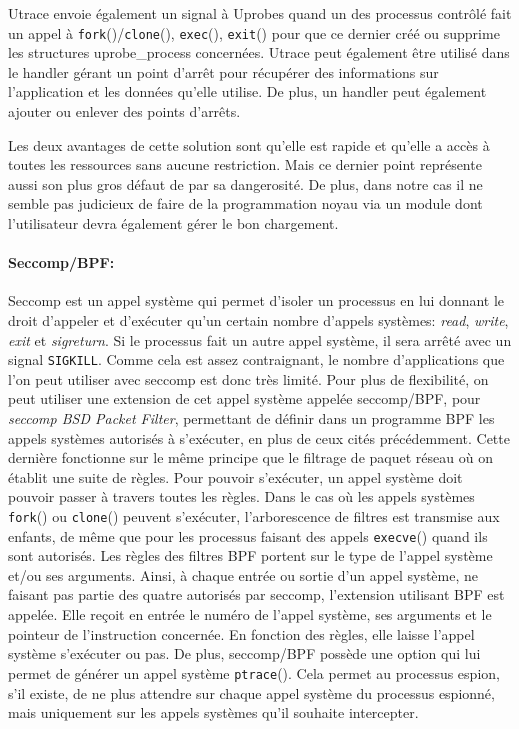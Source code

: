 Utrace envoie également un signal à Uprobes quand un des processus contrôlé fait
un appel à \texttt{fork}()/\texttt{clone}(), \texttt{exec}(), \texttt{exit}()
pour que ce dernier créé ou supprime les structures uprobe\_process
concernées. Utrace peut également être utilisé dans le handler gérant un point
d'arrêt pour récupérer des informations sur l'application et les données qu'elle
utilise. De plus, un handler peut également ajouter ou enlever des points
d'arrêts.

Les deux avantages de cette solution sont qu'elle est rapide et qu'elle a accès
à toutes les ressources sans aucune restriction. Mais ce dernier point
représente aussi son plus gros défaut de par sa dangerosité. De plus, dans notre
cas il ne semble pas judicieux de faire de la programmation noyau via un module
dont l'utilisateur devra également gérer le bon chargement.

\paragraph{Seccomp/BPF:}
\label{paragraph:seccomp/bpf}

Seccomp \citep{seccompbpf} est un appel système qui permet d'isoler un processus
en lui donnant le droit d'appeler et d'exécuter qu'un certain nombre d'appels
systèmes: \textit{read}, \textit{write}, \textit{exit} et \textit{sigreturn}. Si
le processus fait un autre appel système, il sera arrêté avec un signal
\texttt{SIGKILL}. Comme cela est assez contraignant, le nombre d'applications
que l'on peut utiliser avec seccomp est donc très limité. Pour plus de
flexibilité, on peut utiliser une extension de cet appel système appelée
seccomp/BPF, pour \textit{seccomp BSD Packet Filter}, permettant de définir dans
un programme BPF \citep{BPF_mccanne1993bsd} les appels systèmes autorisés à
s'exécuter, en plus de ceux cités précédemment. Cette dernière fonctionne sur le
même principe que le filtrage de paquet réseau où on établit une suite de
règles. Pour pouvoir s'exécuter, un appel système doit pouvoir passer à travers
toutes les règles. Dans le cas où les appels systèmes \texttt{fork}() ou
\texttt{clone}() peuvent s'exécuter, l'arborescence de filtres est transmise aux
enfants, de même que pour les processus faisant des appels \texttt{execve}()
quand ils sont autorisés. Les règles des filtres BPF portent sur le type de
l'appel système et/ou ses arguments. Ainsi, à chaque entrée ou sortie d'un appel
système, ne faisant pas partie des quatre autorisés par seccomp, l'extension
utilisant BPF est appelée. Elle reçoit en entrée le numéro de l'appel système,
ses arguments et le pointeur de l'instruction concernée. En fonction des règles,
elle laisse l'appel système s'exécuter ou pas.  De plus, seccomp/BPF possède une
option qui lui permet de générer un appel système \texttt{ptrace}(). Cela permet
au processus espion, s'il existe, de ne plus attendre sur chaque appel système
du processus espionné, mais uniquement sur les appels systèmes qu'il souhaite
intercepter.

